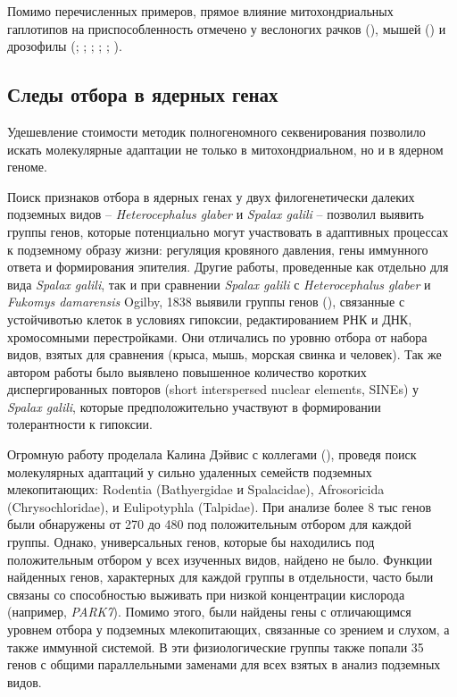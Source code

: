 Помимо перечисленных примеров, прямое влияние митохондриальных гаплотипов на приспособленность отмечено у веслоногих рачков (\cite{Schizas2001}), мышей (\cite{Takeda2000}) и дрозофилы (\cite{Nigro1994}; \cite{Hutter1995}; \cite{Kilpatrick1995}; \cite{Stordeur1997}; \cite{Rand2001}; \cite{James2003}). 


\subsection{Следы отбора в ядерных генах}

Удешевление стоимости методик полногеномного секвенирования позволило искать молекулярные адаптации не только в митохондриальном, но и в ядерном геноме.

Поиск признаков отбора в ядерных генах у двух филогенетически далеких подземных видов -- \textit{Heterocephalus glaber} и \textit{Spalax galili} -- позволил выявить группы генов, которые потенциально могут участвовать в адаптивных процессах к подземному образу жизни: регуляция кровяного давления, гены иммунного ответа и формирования эпителия. Другие работы, проведенные как отдельно для вида \textit{Spalax galili}, так и при сравнении \textit{Spalax galili} с \textit{Heterocephalus glaber} и \textit{Fukomys damarensis} Ogilby, 1838 выявили группы генов (\cite{Fang2015}), связанные с устойчивотью клеток в условиях гипоксии, редактированием РНК и ДНК, хромосомными перестройками. Они отличались по уровню отбора от набора видов, взятых для сравнения (крыса, мышь, морская свинка и человек). Так же автором работы было выявлено повышенное количество коротких диспергированных повторов (short interspersed nuclear elements, SINEs) у \textit{Spalax galili}, которые предположительно участвуют в формировании толерантности к гипоксии. 

Огромную работу проделала Калина Дэйвис с коллегами (\cite{Davies2018}), проведя поиск молекулярных адаптаций у сильно удаленных семейств подземных млекопитающих: Rodentia (Bathyergidae и Spalacidae), Afrosoricida (Chrysochloridae), и Eulipotyphla (Talpidae). При анализе более 8 тыс генов были обнаружены от 270 до 480 под положительным отбором для каждой группы. Однако, универсальных генов, которые бы находились под положительным отбором у всех изученных видов, найдено не было. Функции найденных генов, характерных для каждой группы в отдельности, часто были связаны со способностью выживать при низкой концентрации кислорода (например, \textit{PARK7}). Помимо этого, были найдены гены с отличающимся уровнем отбора у подземных млекопитающих, связанные со зрением и слухом, а также иммунной системой. В эти физиологические группы также попали 35 генов с общими параллельными заменами для всех взятых в анализ подземных видов. 


